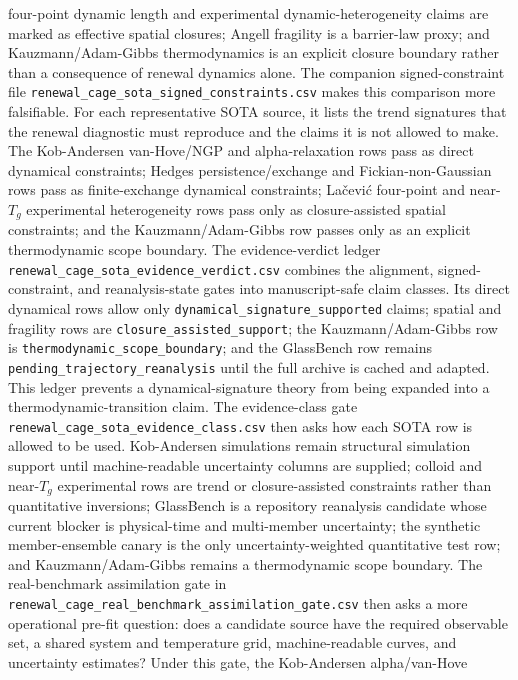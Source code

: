 \documentclass[aps,preprint,onecolumn,superscriptaddress,nofootinbib]{revtex4-2}
\begin{document}
four-point dynamic length and experimental dynamic-heterogeneity claims are
marked as effective spatial closures; Angell fragility is a barrier-law proxy;
and Kauzmann/Adam-Gibbs thermodynamics is an explicit closure boundary rather
than a consequence of renewal dynamics alone.
The companion signed-constraint file
\texttt{renewal\_cage\_sota\_signed\_constraints.csv} makes this comparison
more falsifiable. For each representative SOTA source, it lists the trend
signatures that the renewal diagnostic must reproduce and the claims it is not
allowed to make. The Kob-Andersen van-Hove/NGP and alpha-relaxation rows pass
as direct dynamical constraints; Hedges persistence/exchange and
Fickian-non-Gaussian rows pass as finite-exchange dynamical constraints;
La{\v{c}}evi{\'c} four-point and near-$T_g$ experimental heterogeneity rows
pass only as closure-assisted spatial constraints; and the Kauzmann/Adam-Gibbs
row passes only as an explicit thermodynamic scope boundary.
The evidence-verdict ledger
\texttt{renewal\_cage\_sota\_evidence\_verdict.csv} combines the alignment,
signed-constraint, and reanalysis-state gates into manuscript-safe claim
classes. Its direct dynamical rows allow only
\texttt{dynamical\_signature\_supported} claims; spatial and fragility rows are
\texttt{closure\_assisted\_support}; the Kauzmann/Adam-Gibbs row is
\texttt{thermodynamic\_scope\_boundary}; and the GlassBench row remains
\texttt{pending\_trajectory\_reanalysis} until the full archive is cached and
adapted. This ledger prevents a dynamical-signature theory from being expanded
into a thermodynamic-transition claim.
The evidence-class gate
\texttt{renewal\_cage\_sota\_evidence\_class.csv} then asks how each SOTA row is
allowed to be used. Kob-Andersen simulations remain structural simulation
support until machine-readable uncertainty columns are supplied; colloid and
near-$T_g$ experimental rows are trend or closure-assisted constraints rather
than quantitative inversions; GlassBench is a repository reanalysis candidate
whose current blocker is physical-time and multi-member uncertainty; the
synthetic member-ensemble canary is the only uncertainty-weighted quantitative
test row; and Kauzmann/Adam-Gibbs remains a thermodynamic scope boundary.
The real-benchmark assimilation gate in
\texttt{renewal\_cage\_real\_benchmark\_assimilation\_gate.csv} then asks a
more operational pre-fit question: does a candidate source have the required
observable set, a shared system and temperature grid, machine-readable curves,
and uncertainty estimates? Under this gate, the Kob-Andersen alpha/van-Hove
\end{document}
